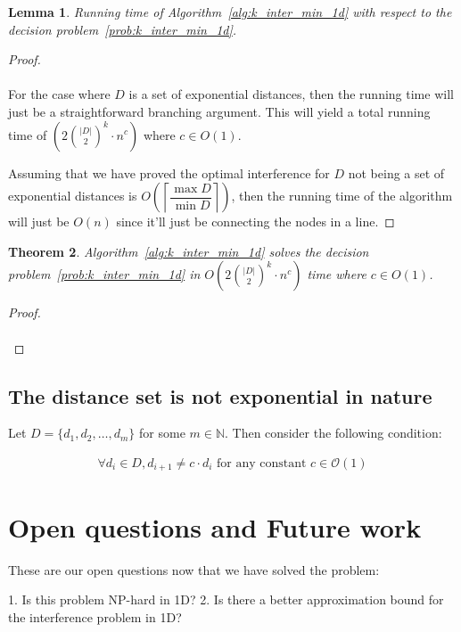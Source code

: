 \documentclass{article}
\newtheorem{theorem}{Theorem}[section]
\newtheorem{lemma}[theorem]{Lemma}
\begin{document}
\begin{lemma}
	Running time of Algorithm~\ref{alg:k_inter_min_1d} with respect to the decision problem~\ref{prob:k_inter_min_1d}.
\end{lemma}
\begin{proof}
	$ $
	\\  \\
	For the case where $D$ is a set of exponential distances, then the running time will just be a straightforward branching argument. This will yield a total running time of $\left(2\binom{|D|}{2}^k \cdot n^c\right)$ where $c \in O(1)$. 

	Assuming that we have proved the optimal interference for $D$ not being a set of exponential distances is $O\left(\left\lceil\dfrac{\max{D}}{\min{D}}\right\rceil\right)$, then the running time of the algorithm will just be $O(n)$ since it'll just be connecting the nodes in a line.
\end{proof}

\begin{theorem}
	Algorithm~\ref{alg:k_inter_min_1d} solves the decision problem~\ref{prob:k_inter_min_1d} in $O\left(2\binom{|D|}{2}^k \cdot n^c\right)$ time where $c \in O(1)$.
\end{theorem}
\begin{proof}
	$ $
	\\ \\
\end{proof}

\subsection{The distance set is not exponential in nature}
Let $D = \{d_1, d_2, \dots, d_m\}$ for some $m \in \mathbb{N}$. Then consider the following condition:

\begin{align*}
	\forall d_i \in D, d_{i+1} \neq c \cdot d_i \text{ for any constant } c \in \mathcal{O}(1)
\end{align*}

\section{Open questions and Future work}
These are our open questions now that we have solved the problem:

1. Is this problem NP-hard in 1D?
2. Is there a better approximation bound for the interference problem in 1D?




\end{document}

